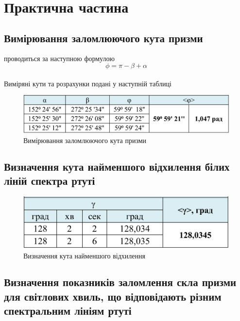 \section{Практична частина}
\subsection{Вимірювання заломлюючого кута призми}
\setlength{\parindent}{4em}
 проводиться за наступною формулою
$$\phi =\pi - \beta + \alpha$$\\
Виміряні кути та розрахунки подані у наступній таблиці

\begin{figure}[ht]

\centering

\includegraphics[width=1\linewidth]{Pics/tabl1.png}

\caption{Вимірювання заломлюючого кута призми}

\label{Prac1}

\end{figure}
\subsection{ Визначення кута найменшого відхилення білих ліній спектра ртуті}

\begin{figure}[ht]

\centering

\includegraphics[width=1\linewidth]{Pics/tabl2.png}

\caption{Визначення кута найменшого відхилення}

\label{Prac2}

\end{figure}
\newpage
\subsection{Визначення показників заломлення скла призми для світлових хвиль, що відповідають
різним спектральним лініям ртуті}

